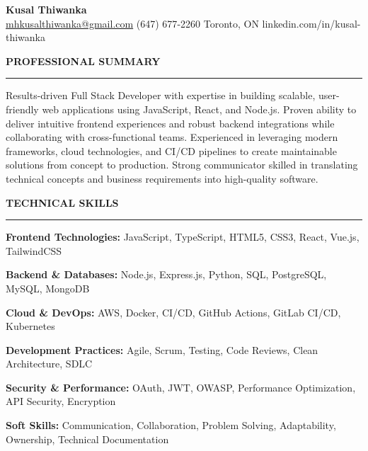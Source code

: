 \documentclass[10pt,letterpaper]{article}
\begin{document}
\begin{center}
{\LARGE\textbf{Kusal Thiwanka}}\\[3pt]
\href{mailto:mhkusalthiwanka@gmail.com}{mhkusalthiwanka@gmail.com}\hspace{2em}%
(647) 677{-}2260\hspace{2em}%
Toronto, ON\hspace{2em}
linkedin.com/in/kusal-thiwanka
\end{center}

\vspace{6pt}

\textbf{PROFESSIONAL SUMMARY}\\[-8pt]
\noindent\rule{\textwidth}{1pt}

\vspace{-2pt}

Results-driven Full Stack Developer with expertise in building scalable, user-friendly web applications using JavaScript, React, and Node.js. Proven ability to deliver intuitive frontend experiences and robust backend integrations while collaborating with cross-functional teams. Experienced in leveraging modern frameworks, cloud technologies, and CI/CD pipelines to create maintainable solutions from concept to production. Strong communicator skilled in translating technical concepts and business requirements into high-quality software.

\vspace{8pt}

\textbf{TECHNICAL SKILLS}\\[-8pt]
\noindent\rule{\textwidth}{1pt}

\vspace{-2pt}

\textbf{Frontend Technologies:} JavaScript, TypeScript, HTML5, CSS3, React, Vue.js, TailwindCSS

\textbf{Backend \& Databases:} Node.js, Express.js, Python, SQL, PostgreSQL, MySQL, MongoDB

\textbf{Cloud \& DevOps:} AWS, Docker, CI/CD, GitHub Actions, GitLab CI/CD, Kubernetes

\textbf{Development Practices:} Agile, Scrum, Testing, Code Reviews, Clean Architecture, SDLC

\textbf{Security \& Performance:} OAuth, JWT, OWASP, Performance Optimization, API Security, Encryption

\textbf{Soft Skills:} Communication, Collaboration, Problem Solving, Adaptability, Ownership, Technical Documentation
\end{document}
